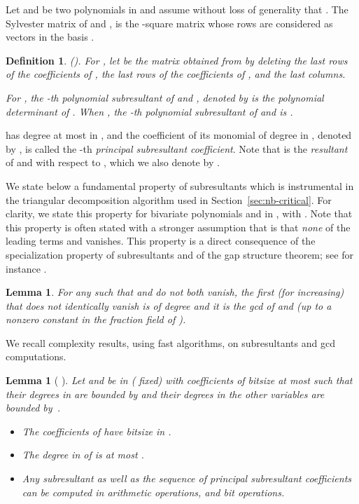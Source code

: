 \documentclass{sig-alternate}
\makeatletter
\newtheorem{definition}[theorem]{Definition}
\newtheorem{lemma}[theorem]{Lemma}
\def\cramped                           {\parskip0pt\@topsep0pt       \itemsep0pt\parsep0pt
}
\makeatother
\begin{document}
Let  and  be two polynomials
in  and assume without loss of generality that . The Sylvester
matrix of  and ,  is the -square matrix whose rows are
 considered as vectors in the basis
. 


\begin{definition}\label{def:sub-resultant}(\cite[\S 3]{Kahoui03}). 
  For , let  be the  matrix obtained from  by deleting the  last rows of the
  coefficients of , the  last rows of the coefficients of , and the 
  last columns.
 
  For , the -th polynomial subresultant of  and
  , denoted by  is the polynomial determinant of
  .  When , the -th polynomial subresultant of  and 
  is .\end{definition}


 has degree at most  in , and the coefficient of its
monomial of degree  in , denoted by , is called the
-th \emph{principal subresultant coefficient}.  Note that  is the \emph{resultant} of  and  with respect to
, which we also denote by .  





\smallskip
We state below a fundamental property of subresultants which is instrumental in
the triangular decomposition algorithm used in Section~\ref{sec:nb-critical}. For
clarity, we state this property for bivariate polynomials  and  in , with .
Note that this property is often stated with a stronger assumption that is that
\emph{none} of the leading terms  and  vanishes.  This
property is a direct consequence of the specialization property of subresultants
and of the gap structure theorem; see for instance \cite[Lemmas 2.3, 3.1 and
Cor. 5.1]{Kahoui03}.

\begin{lemma}\label{lem:fund-prop-subres}
  For any  such that  and  do not both vanish,
  the first  (for  increasing) that does not
  identically vanish is of degree  and it is the gcd of  and
   (up to a nonzero constant in the fraction field of
  ).
\end{lemma}




\quad
We recall complexity results, using fast algorithms, on subresultants and
gcd computations. 

\begin{lemma}[{\cite[Prop. 8.46]{BPR06} \cite[\S 8]{Reischert1997} \cite[Cor. 11.15]{vzGGer2}}]
  \label{complexity:subresultant}
  Let  and  be in  ( fixed) with
  coefficients of bitsize at most  
such that their degrees in  are bounded by
   and their degrees in the other variables are bounded by~. 
  \begin{itemize}\cramped
  \item The coefficients of  have bitsize in
    . 
  \item The degree in  of  is at most
    . 
  \item Any subresultant  as well as the sequence of principal subresultant coefficients  can be computed in
 arithmetic operations, 
    and  bit operations. 
\end{itemize}
\end{lemma}    
\end{document}
